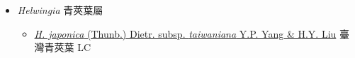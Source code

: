 
  \begin{itemize}
 \item[] \textit{Helwingia} 青莢葉屬
                    
  \begin{itemize}
        \item[] \href{http://www.theplantlist.org/tpl1.1/search?q=Helwingia+japonica+subsp.+taiwaniana}{\textit{H. japonica} (Thunb.) Dietr. subsp. \textit{taiwaniana} Y.P. Yang \& H.Y. Liu}   臺灣青莢葉 LC
  \end{itemize}
  \end{itemize}
